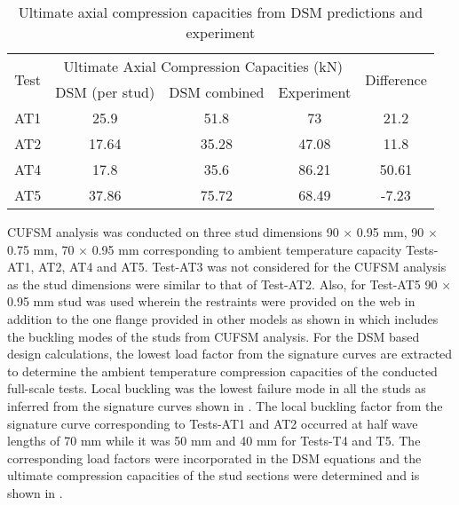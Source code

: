 \begin{table}[htbp]
	\centering
	\caption{Ultimate axial compression capacities from DSM predictions and experiment}
	  \begin{tabular}{ccccc}
	  \toprule
	  \multirow{2}[4]{*}{Test} & \multicolumn{3}{c}{Ultimate Axial Compression Capacities (kN)} & \multirow{2}[4]{*}{Difference} \\
  \cmidrule{2-4}          & DSM (per stud) & DSM combined & Experiment &  \\
	  \midrule
	  AT1   & 25.9  & 51.8  & 73    & 21.2 \\
	  AT2   & 17.64 & 35.28 & 47.08 & 11.8 \\
	  AT4   & 17.8  & 35.6  & 86.21 & 50.61 \\
	  AT5   & 37.86 & 75.72 & 68.49 & -7.23 \\
	  \bottomrule
	  \end{tabular}%
	\label{tab:dsm-ambient}%
  \end{table}%
  
CUFSM analysis was conducted on three stud dimensions 90 $\times$ 0.95 mm, 90 $\times$ 0.75 mm, 70 $\times$ 0.95 mm corresponding to ambient temperature capacity Tests-AT1, AT2, AT4 and AT5. Test-AT3 was not considered for the CUFSM analysis as the stud dimensions were similar to that of Test-AT2. Also, for Test-AT5 90 $\times$ 0.95 mm stud was used wherein the restraints were provided on the web in addition to the one flange provided in other models as shown in  which includes the buckling modes of the studs from CUFSM analysis. For the DSM based design calculations, the lowest load factor from the signature curves are extracted to determine the ambient temperature compression capacities of the conducted full-scale tests. Local buckling was the lowest failure mode in all the studs as inferred from the signature curves shown in . The local buckling factor from the signature curve corresponding to Tests-AT1 and AT2 occurred at half wave lengths of 70 mm while it was 50 mm and 40 mm for Tests-T4 and T5. The corresponding load factors were incorporated in the DSM equations and the ultimate compression capacities of the stud sections were determined and is shown in . 

